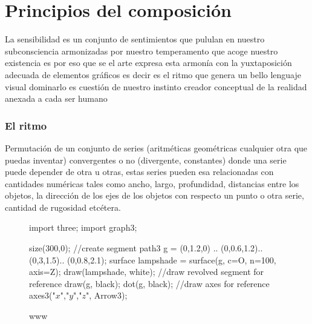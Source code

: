 \chapter{Principios del composición}

La sensibilidad es un conjunto de sentimientos que pululan en nuestro subconsciencia armonizadas por nuestro temperamento que acoge nuestro existencia es por eso que se el arte expresa esta armonía con la yuxtaposición adecuada de elementos gráficos es decir es el ritmo que genera un bello lenguaje visual dominarlo es cuestión de nuestro instinto creador conceptual de la realidad anexada a cada ser humano
\subsection{El ritmo} Permutación de un conjunto de series (aritméticas geométricas cualquier otra que puedas inventar) convergentes o no (divergente, constantes) donde una serie puede depender de otra u otras, estas series pueden esa relacionadas con cantidades numéricas tales como ancho, largo, profundidad, distancias entre los objetos, la dirección de los ejes de los objetos con respecto un punto o otra serie, cantidad de rugosidad etcétera.


\begin{figure}
	\begin{asy}
	import three;
	import graph3;

	size(300,0);
	//create segment
	path3 g = (0,1.2,0) ..
	(0,0.6,1.2)..
	(0,3,1.5)..
	(0,0.8,2.1);
	surface lampshade =
	surface(g, c=O, n=100, axis=Z);
	draw(lampshade, white);
	//draw revolved segment for reference
	draw(g, black);
	dot(g, black);
	//draw axes for reference
	axes3("$x$","$y$","$z$", Arrow3);
	\end{asy}

	\caption{www}
\end{figure}




